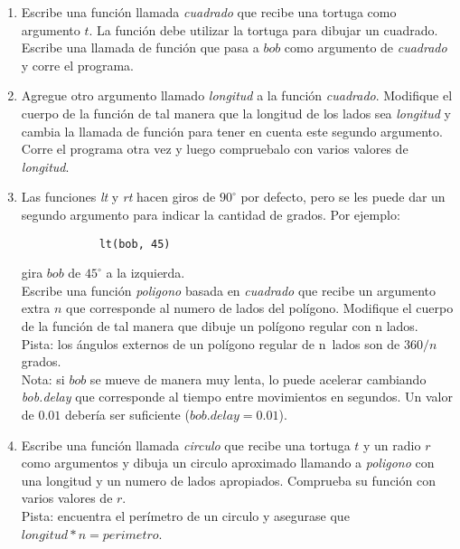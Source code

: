 \documentclass[10pt, twocolumn]{article}
\begin{document}
\begin{enumerate}
\item Escribe una función llamada \emph{cuadrado} que recibe una tortuga como argumento $t$. La función debe utilizar la tortuga para dibujar un cuadrado. Escribe una llamada de función que pasa a $bob$ como argumento de \emph{cuadrado} y corre el programa.

\item Agregue otro argumento llamado \emph{longitud} a la función \emph{cuadrado}. Modifique el cuerpo de la función de tal manera que la longitud de los lados sea \emph{longitud} y cambia la llamada de función para tener en cuenta este segundo argumento. Corre el programa otra vez y luego compruebalo con varios valores de \emph{longitud}.

\item Las funciones \emph{lt} y \emph{rt} hacen giros de $90^{\circ}$ por defecto, pero se les puede dar un segundo argumento para indicar la cantidad de grados. Por ejemplo:
		\begin{verbatim}
			lt(bob, 45)
		\end{verbatim}
gira $bob$ de $45^{\circ}$ a la izquierda.\\ 
Escribe una función \emph{poligono} basada en \emph{cuadrado} que recibe un argumento extra $n$ que corresponde al numero de lados del polígono. Modifique el cuerpo de la función de tal manera que dibuje un polígono regular con n lados.\\
Pista: los ángulos externos de un polígono regular de n~lados son de $360/n$ grados.\\
Nota: si $bob$ se mueve de manera muy lenta, lo puede acelerar cambiando \emph{bob.delay} que corresponde al tiempo entre movimientos en segundos. Un valor de $0.01$ debería ser suficiente ($bob.delay = 0$.$01$).

\item Escribe una función llamada \emph{circulo} que recibe una tortuga $t$ y un radio $r$ como argumentos y dibuja un circulo aproximado llamando a \emph{poligono} con una longitud y un numero de lados apropiados. Comprueba su función con varios valores de $r$.\\
Pista: encuentra el perímetro de un circulo y asegurase que $longitud * n = perimetro$.

\end{enumerate}
\end{document}
